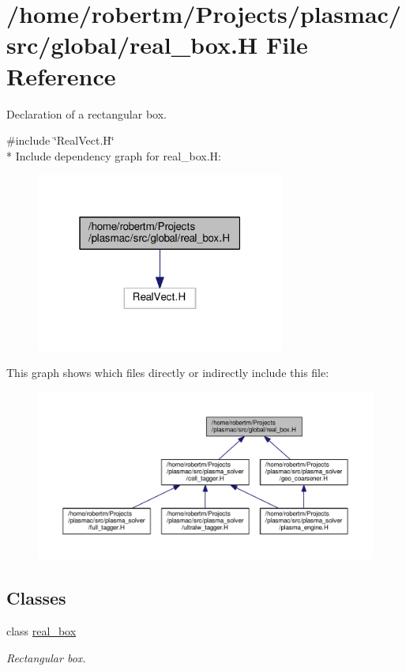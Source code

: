 \hypertarget{real__box_8H}{}\section{/home/robertm/\+Projects/plasmac/src/global/real\+\_\+box.H File Reference}
\label{real__box_8H}


Declaration of a rectangular box.  


{\ttfamily \#include \char`\"{}Real\+Vect.\+H\char`\"{}}\\*
Include dependency graph for real\+\_\+box.\+H\+:\nopagebreak
\begin{figure}[H]
\begin{center}
\leavevmode
\includegraphics[width=232pt]{real__box_8H__incl}
\end{center}
\end{figure}
This graph shows which files directly or indirectly include this file\+:\nopagebreak
\begin{figure}[H]
\begin{center}
\leavevmode
\includegraphics[width=350pt]{real__box_8H__dep__incl}
\end{center}
\end{figure}
\subsection*{Classes}
\begin{DoxyCompactItemize}
\item 
class \hyperlink{classreal__box}{real\+\_\+box}
\begin{DoxyCompactList}\small\item\em Rectangular box. \end{DoxyCompactList}\end{DoxyCompactItemize}


